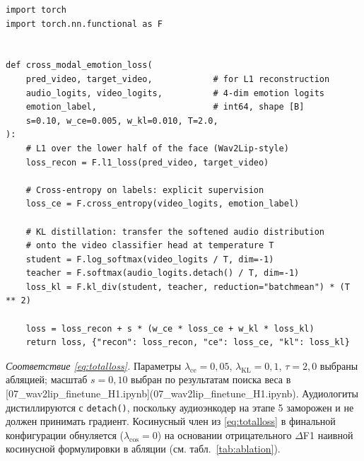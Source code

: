 \documentclass[a4paper, 12pt, oneside, openany]{article}
\begin{document}
\begin{lstlisting}[label=lst:loss, caption=Кросс-модальная функция потерь (CE+KL)]
import torch
import torch.nn.functional as F


def cross_modal_emotion_loss(
    pred_video, target_video,            # for L1 reconstruction
    audio_logits, video_logits,          # 4-dim emotion logits
    emotion_label,                       # int64, shape [B]
    s=0.10, w_ce=0.005, w_kl=0.010, T=2.0,
):
    # L1 over the lower half of the face (Wav2Lip-style)
    loss_recon = F.l1_loss(pred_video, target_video)

    # Cross-entropy on labels: explicit supervision
    loss_ce = F.cross_entropy(video_logits, emotion_label)

    # KL distillation: transfer the softened audio distribution
    # onto the video classifier head at temperature T
    student = F.log_softmax(video_logits / T, dim=-1)
    teacher = F.softmax(audio_logits.detach() / T, dim=-1)
    loss_kl = F.kl_div(student, teacher, reduction="batchmean") * (T ** 2)

    loss = loss_recon + s * (w_ce * loss_ce + w_kl * loss_kl)
    return loss, {"recon": loss_recon, "ce": loss_ce, "kl": loss_kl}
\end{lstlisting}

\textit{Соответствие \eqref{eq:totalloss}.} Параметры $\lambda_{\text{ce}}=0{,}05$, $\lambda_{\text{KL}}=0{,}1$, $\tau=2{,}0$ выбраны абляцией; масштаб $s=0{,}10$ выбран по результатам поиска веса в [07\_wav2lip\_finetune\_H1.ipynb](07\_wav2lip\_finetune\_H1.ipynb). Аудиологиты дистиллируются с \texttt{detach()}, поскольку аудиоэнкодер на этапе 5 заморожен и не должен принимать градиент. Косинусный член из \eqref{eq:totalloss} в финальной конфигурации обнуляется ($\lambda_{\cos}=0$) на основании отрицательного $\Delta$F1 наивной косинусной формулировки в абляции (см. табл.~\ref{tab:ablation}).

\newpage
\section{\centering}\label{PrilV}
\begin{center}
\end{center}
\setcounter{equation}{0}
\renewcommand{\theequation}{\Asbuk{section}.\arabic{equation}}
\setcounter{table}{0}
\renewcommand{\thetable}{\Asbuk{section}.\arabic{table}}
\setcounter{figure}{0}
\renewcommand{\thefigure}{\Asbuk{section}.\arabic{figure}}
\end{document}
